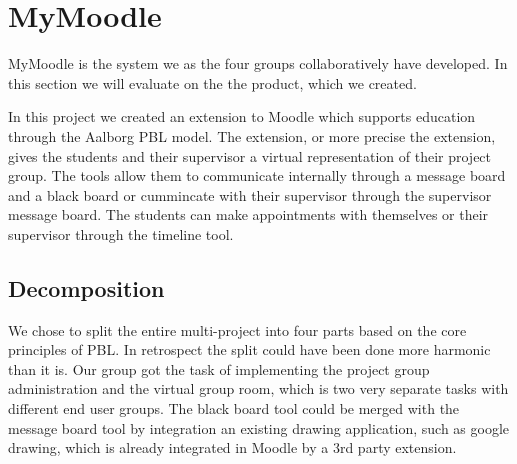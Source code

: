 \section{MyMoodle}
MyMoodle is the system we as the four groups collaboratively have developed.
In this section we will evaluate on the the product, which we created.


In this project we created an extension to Moodle which supports education through the Aalborg PBL model. 
The extension, or more precise the extension, gives the students and their supervisor a virtual representation of their project group. 
The tools allow them to communicate internally through a message board and a black board or cummincate with their supervisor through the supervisor message board.
The students can make appointments with themselves or  their supervisor through the timeline tool.


\subsection{Decomposition}
We chose to split the entire multi-project into four parts based on the core principles of PBL. 
In retrospect the split could have been done more harmonic than it is.
Our group got the task of implementing the project group administration and the virtual group room, which is two very separate tasks with different end user groups. 
The black board tool could be merged with the message board tool by integration an existing drawing application, such as google drawing, which is already integrated in Moodle by a 3rd party extension. 

